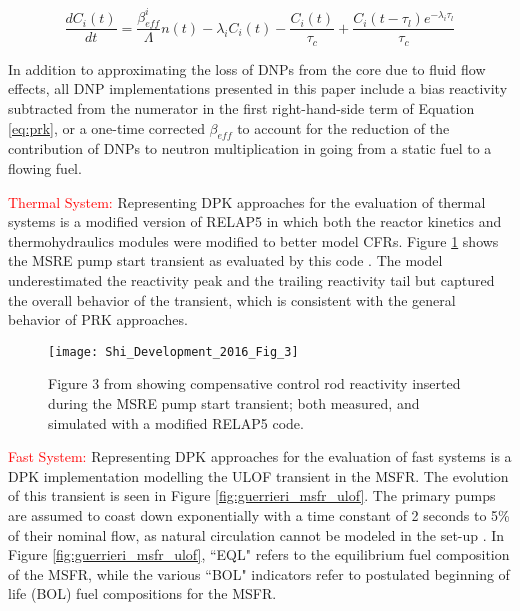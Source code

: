 \documentclass[review]{elsarticle}
\begin{document}
\begin{equation}
    \label{eq:dpk_dnp}
    \frac{dC_{i}(t)}{dt} = \frac{\beta_{eff}^{i}}{\Lambda} n(t) -
        \lambda_{i} C_{i}(t) - \frac{C_{i}(t)}{\tau_{c}} +
        \frac{C_{i}(t - \tau_{l}) e^{-\lambda_{i} \tau_{l}}}{\tau_{c}}
\end{equation}

In addition to approximating the loss of DNPs from the core due to fluid
flow effects, all DNP implementations presented in this paper include
a bias reactivity subtracted from the numerator in the first right-hand-side
term of Equation \ref{eq:prk}, or a one-time corrected $\beta_{eff}$ to account
for the reduction of the contribution of DNPs to neutron multiplication in
going from a static fuel to a flowing fuel.

\par \textcolor{red}{Thermal System:} Representing DPK approaches for the evaluation of thermal
systems is a modified version of RELAP5 \cite{shi_development_2016} in
which both the reactor kinetics and thermohydraulics modules were modified
to better model CFRs. Figure \ref{fig:shi_msre_ps} 
shows the MSRE pump start transient as evaluated by this code \cite{shi_development_2016}.
The model underestimated
the reactivity peak and the trailing reactivity tail but captured the
overall behavior of the transient, which is consistent with the
general behavior of PRK approaches.

\begin{figure}[H]
   \centering
   \texttt{[image: Shi\_Development\_2016\_Fig\_3]}
   \caption{Figure 3 from \cite{shi_development_2016} showing 
    compensative control rod reactivity inserted during the MSRE pump start
   transient; both measured, and simulated with a modified RELAP5 code.} 
   \label{fig:shi_msre_ps}
\end{figure}

\par \textcolor{red}{Fast System:} Representing DPK approaches for the evaluation of fast
systems is a DPK implementation \cite{guerrieri_investigation_2013}
modelling the ULOF transient in the MSFR. The evolution of this transient is
seen in Figure \ref{fig:guerrieri_msfr_ulof}. The primary pumps are
assumed to coast down exponentially with a time constant of 2 seconds to 5\%
 of their nominal flow, as natural circulation cannot be modeled in the set-up
\cite{guerrieri_investigation_2013}. In Figure 
\ref{fig:guerrieri_msfr_ulof}, 
``EQL" refers to the equilibrium fuel composition of the
MSFR, while the various ``BOL" indicators refer to postulated beginning of life (BOL) fuel
compositions for the MSFR. 
\end{document}
